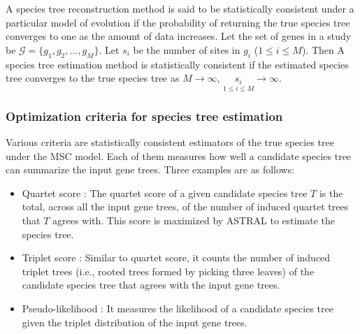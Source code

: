 A species tree reconstruction method is said to be statistically consistent under a particular model of evolution if the probability of returning the true species tree converges to one as the amount of data increases. Let the set of genes in a study be $\mathcal{G} = \{g_1, g_2, \dots, g_M\}$. Let $s_i$ be the number of sites in $g_i$ ($1 \leq i \leq M$). Then A species tree estimation method is statistically consistent if the estimated species tree converges to the true species tree as $M \rightarrow \infty$, $\underset{1 \leq i \leq M}{s_i} \rightarrow \infty$.


\subsubsection{Optimization criteria for species tree estimation}
Various criteria are statistically consistent estimators of the true species tree under the MSC model. Each of them measures how well a candidate species tree can summarize the input gene trees. Three examples are as follows:
\begin{itemize}
	\item Quartet score \cite{mirarab2014astral}: The quartet score of a given candidate species tree $T$ is the total, across all the input gene trees, of the number of induced quartet trees that $T$ agrees with. This score is maximized by ASTRAL to estimate the species tree.
	\item Triplet score \cite{islam2019stelar}: Similar to quartet score, it counts the number of induced triplet trees (i.e., rooted trees formed by picking three leaves) of the candidate species tree that agrees with the input gene trees.
	\item Pseudo-likelihood \cite{mpest}: It measures the likelihood of a candidate species tree given the triplet distribution of the input gene trees.
\end{itemize}


